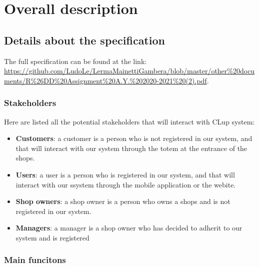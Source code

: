 \section{Overall description}
\label{sect:overalldescription}



\subsection{Details about the specification}
\label{subsect:furtherdetailsaboutspecification}

The full specification can be found at the link: \url{https://github.com/LudoLe/LermaMainettiGambera/blob/master/other%20documents/R%26DD%20Assignment%20A.Y.%202020-2021%20(2).pdf}.

\subsubsection{Stakeholders}
\label{subsubsect:stakeholders}

Here are listed all the potential stakeholders that will interact with CLup system:
\begin{itemize}[topsep=0pt]
    \item \textbf{Customers}: a customer is a person who is not registered in our system, and that will interact with our system through the totem at the entrance of the shops.
    \item \textbf{Users}: a user is a person who is registered in our system, and that will interact with our ssystem through the mobile application or the webite.
    \item \textbf{Shop owners}: a shop owner is a person who owns a shops and is not registered in our system.
    \item \textbf{Managers}: a manager is a shop owner who has decided to adherit to our system and is registered
\end{itemize}

\subsubsection{Main funcitons}
\label{subsect:mainfunctions}

